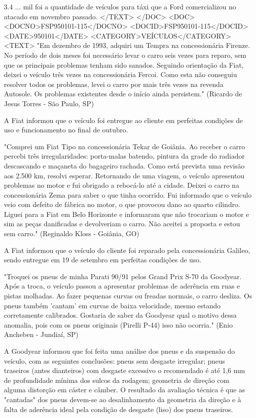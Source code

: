 3.4 
... mil foi a quantidade de veículos para táxi que a Ford comercializou no atacado em novembro passado.
</TEXT>
</DOC>
<DOC>
<DOCNO>FSP950101-115</DOCNO>
<DOCID>FSP950101-115</DOCID>
<DATE>950101</DATE>
<CATEGORY>VEÍCULOS</CATEGORY>
<TEXT>
"Em dezembro de 1993, adquiri um Tempra na concessionária Firenze. No período de dois meses foi necessário levar o carro seis vezes para reparo, sem que os principais problemas tenham sido sanados. Seguindo orientação da Fiat, deixei o veículo três vezes na concessionária Fercoi. Como esta não conseguiu resolver todos os problemas, levei o carro por mais três vezes na revenda Autosole. Os problemas existentes desde o início ainda persistem." 
(Ricardo de Jesus Torres - São Paulo, SP) 

A Fiat informou que o veículo foi entregue ao cliente em perfeitas condições de uso e funcionamento no final de outubro.

 "Comprei um Fiat Tipo na concessionária Tekar de Goiânia. Ao receber o carro percebi três irregularidades: porta-malas batendo, pintura da grade do radiador descascando e maçaneta do bagageiro rachada. Como está prevista uma revisão aos 2.500 km, resolvi esperar. Retornando de uma viagem, o veículo apresentou problemas no motor e fui obrigado a rebocá-lo até a cidade. Deixei o carro na concessionária Zema para saber o que tinha ocorrido. Fui informado que o veículo veio com defeito de fábrica no motor, o que provocou dano ao quarto cilindro. Liguei para a Fiat em Belo Horizonte e informaram que não trocariam o motor e sim as peças danificadas e devolveriam o carro. Não aceitei a proposta e estou sem carro." (Reginaldo Kloss - Goiânia, GO) 

A Fiat informou que o veículo do cliente foi reparado pela concessionária Galileo, sendo entregue em 19 de setembro em perfeitas condições de uso.

 "Troquei os pneus de minha Parati 90/91 pelos Grand Prix S-70 da Goodyear. Após a troca, o veículo passou a apresentar problemas de aderência em ruas e pistas molhadas. Ao fazer pequenas curvas ou freadas normais, o carro desliza. Os pneus também 'cantam' em curvas de baixa velocidade, mesmo estando corretamente calibrados. Gostaria de saber da Goodyear qual o motivo dessa anomalia, pois com os pneus originais (Pirelli P-44) isso não ocorria." 
(Enio Ancheben - Jundiaí, SP) 

A Goodyear informou que foi feita uma análise dos pneus e da suspensão do veículo, com as seguintes conclusões: pneus sem desgaste irregular; pneus traseiros (antes dianteiros) com desgaste excessivo o recomendado é até 1,6 mm de profundidade mínima dos sulcos da rodagem; geometria de direção com alguma distorção em cáster e câmber. O resultado da avaliação técnica é que as "cantadas" dos pneus devem-se ao desalinhamento da geometria da direção e à falta de aderência ideal pela condição de desgaste (liso) dos pneus traseiros.

